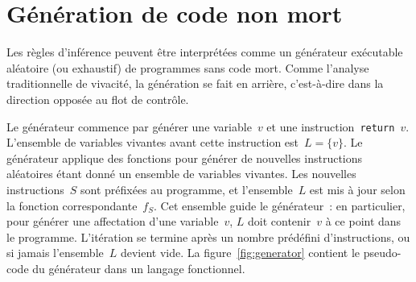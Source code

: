 \documentclass[a4paper]{easychair}
\begin{document}
\section{Génération de code non mort}

Les règles d'inférence peuvent être interprétées comme un générateur
exécutable aléatoire (ou exhaustif) de programmes sans code mort. Comme
l'analyse traditionnelle de vivacité, la génération se fait en arrière,
c'est-à-dire dans la direction opposée au flot de contrôle.

Le générateur commence par générer une variable~\(v\) et une
instruction~\texttt{return \(v\)}. L'ensemble de variables vivantes avant
cette instruction est~\(L = \{v\}\). Le générateur applique des fonctions
pour générer de nouvelles instructions aléatoires étant donné un ensemble
de variables vivantes. Les nouvelles instructions~\(S\) sont préfixées au
programme, et l'ensemble~\(L\) est mis à jour selon la fonction
correspondante~\(f_S\). Cet ensemble guide le générateur~: en particulier,
pour générer une affectation d'une variable~\(v\), \(L\) doit contenir~\(v\)
à ce point dans le programme. L'itération se termine après un nombre
prédéfini d'instructions, ou si jamais l'ensemble~\(L\) devient vide. La
figure~\ref{fig:generator} contient le pseudo-code du générateur dans un
langage fonctionnel.
\end{document}
